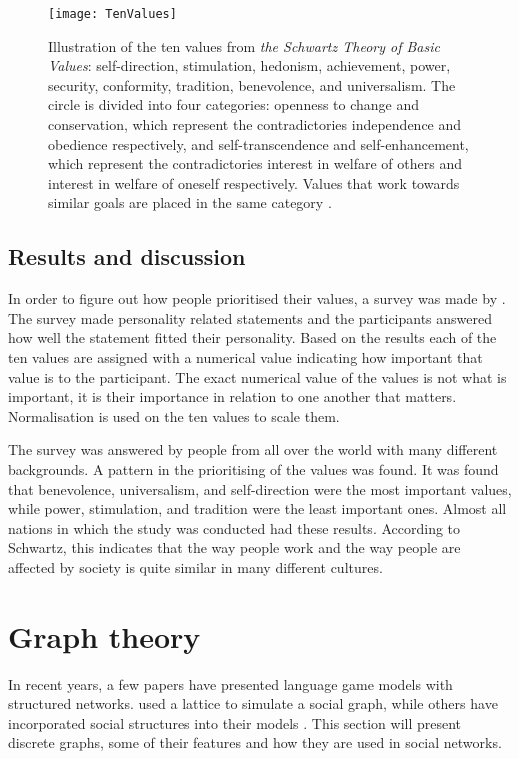 \begin{figure}
    \centering
    \texttt{[image: TenValues]}   
    \caption[Illustration of the ten values from \textit{the Schwartz Theory of Basic Values}.]{Illustration of the ten values from \textit{the Schwartz Theory of Basic Values}: self-direction, stimulation, hedonism, achievement, power, security, conformity, tradition, benevolence, and universalism. The circle is divided into four categories: openness to change and conservation, which represent the contradictories independence and obedience respectively, and self-transcendence and self-enhancement, which represent the contradictories interest in welfare of others and interest in welfare of oneself respectively. Values that work towards similar goals are placed in the same category \citep{schwartz2012overview}.}
    \label{fig:TenValuesSchwartz}
\end{figure}

\subsection{Results and discussion}
In order to figure out how people prioritised their values, a survey was made by \citet{schwartz2012overview}. The survey made personality related statements and the participants answered how well the statement fitted their personality. Based on the results each of the ten values are assigned with a numerical value indicating how important that value is to the participant. The exact numerical value of the values is not what is important, it is their importance in relation to one another that matters. Normalisation is used on the ten values to scale them. 

The survey was answered by people from all over the world with many different backgrounds. A pattern in the prioritising of the values was found. It was found that benevolence, universalism, and self-direction were the most important values, while power, stimulation, and tradition were the least important ones. Almost all nations in which the study was conducted had these results. According to Schwartz, this indicates that the way people work and the way people are affected by society is quite similar in many different cultures.


\section{Graph theory}
In recent years, a few papers have presented language game models with structured networks. \citet{lipowska2011naming} used a lattice to simulate a social graph, while others have incorporated social structures into their models \citep{lekvam2014co, gong2004computational}. This section will present discrete graphs, some of their features and how they are used in social networks.

